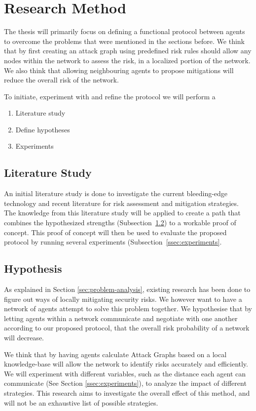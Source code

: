 \section{Research Method}
The thesis will primarily focus on defining a functional protocol between agents to overcome the problems that were mentioned in the sections before. We think that by first creating an attack graph using predefined risk rules should allow any nodes within the network to assess the risk, in a localized portion of the network. We also think that allowing neighbouring agents to propose mitigations will reduce the overall risk of the network. 

To initiate, experiment with and refine the protocol we will perform a 
\begin{enumerate}
    \item Literature study
    \item Define hypotheses
    \item Experiments
\end{enumerate}

\subsection{Literature Study}
An initial literature study is done to investigate the current bleeding-edge technology and recent literature for risk assessment and mitigation strategies. The knowledge from this literature study will be applied to create a path that combines the hypothesized strengths (Subsection~\ref{ssec:hypothesis}) to a workable proof of concept. This proof of concept will then be used to evaluate the proposed protocol by running several experiments (Subsection~\ref{ssec:experiments}.

\subsection{Hypothesis} \label{ssec:hypothesis}
As explained in Section \ref{sec:problem-analysis}, existing research has been done to figure out ways of locally mitigating security risks. We however want to have a network of agents attempt to solve this problem together. We hypothesise that by letting agents within a network communicate and negotiate with one another according to our proposed protocol, that the overall risk probability of a network will decrease. 

We think that by having agents calculate Attack Graphs based on a local knowledge-base will allow the network to identify risks accurately and efficiently. We will experiment with different variables, such as the distance each agent can communicate (See Section \ref{ssec:experiments}), to analyze the impact of different strategies. This research aims to investigate the overall effect of this method, and will not be an exhaustive list of possible strategies. 

